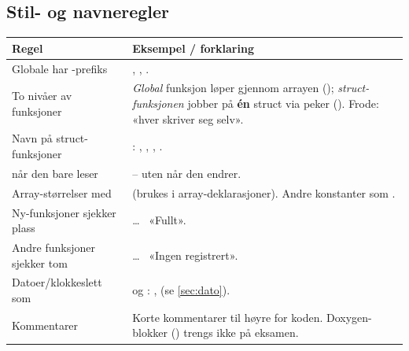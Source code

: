 \subsection{Stil- og navneregler}
\begin{center}
\begin{tabular}{@{}L{4.3cm}L{11.3cm}@{}}
\toprule
\textbf{Regel} & \textbf{Eksempel / forklaring} \\
\midrule
Globale har -prefiks & , , . \\
To nivåer av funksjoner & \emph{Global} funksjon løper gjennom arrayen (); \emph{struct-funksjonen} jobber på \textbf{én} struct via peker (). Frode: «hver skriver seg selv». \\
Navn på struct-funksjoner & : , , , . \\
 når den bare leser &  -- uten  når den endrer. \\
Array-størrelser med  &  (brukes i array-deklarasjoner). Andre konstanter som . \\
Ny-funksjoner sjekker plass &  \dots\  «Fullt». \\
Andre funksjoner sjekker tom &  \dots\  «Ingen registrert». \\
Datoer/klokkeslett som  &  og : ,  (se \ref{sec:dato}). \\
Kommentarer & Korte kommentarer til høyre for koden. Doxygen-blokker () trengs ikke på eksamen. \\
\bottomrule
\end{tabular}
\end{center}
